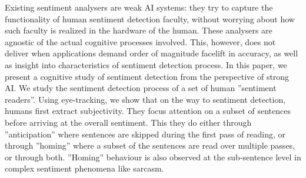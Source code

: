Existing sentiment analysers are weak AI systems: they try to capture the functionality of human sentiment detection faculty, without worrying about how such faculty is realized in the hardware of the human. These analysers are agnostic of the actual cognitive processes involved. This, however, does not deliver when applications demand order of magnitude facelift in accuracy, as well as insight into characteristics of sentiment detection process. In this paper, we present a cognitive study of sentiment detection from the perspective of strong AI. We study the sentiment detection process of a set of human ''sentiment readers''. Using eye-tracking, we show that on the way to sentiment detection, humans first extract subjectivity. They focus attention on a subset of sentences before arriving at the overall sentiment. This they do either through ''anticipation'' where sentences are skipped during the first pass of reading, or through ''homing'' where a subset of the sentences are read over multiple passes, or through both. ''Homing'' behaviour is also observed at the sub-sentence level in complex sentiment phenomena like sarcasm.
